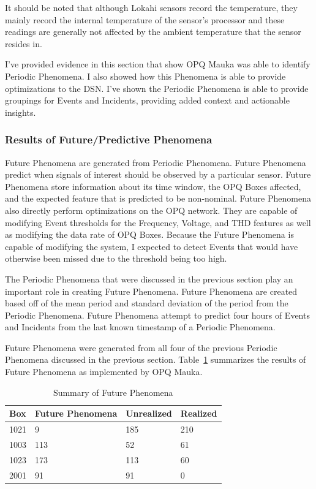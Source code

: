 It should be noted that although Lokahi sensors record the temperature, they mainly record the internal temperature of the sensor's processor and these readings are generally not affected by the ambient temperature that the sensor resides in.

I've provided evidence in this section that show OPQ Mauka was able to identify Periodic Phenomena. I also showed how this Phenomena is able to provide optimizations to the DSN. I've shown the Periodic Phenomena is able to provide groupings for Events and Incidents, providing added context and actionable insights.

\subsubsection{Results of Future/Predictive Phenomena}

Future Phenomena are generated from Periodic Phenomena. Future Phenomena predict when signals of interest should be observed by a particular sensor. Future Phenomena store information about its time window, the OPQ Boxes affected, and the expected feature that is predicted to be non-nominal. Future Phenomena also directly perform optimizations on the OPQ network. They are capable of modifying Event thresholds for the Frequency, Voltage, and THD features as well as modifying the data rate of OPQ Boxes. Because the Future Phenomena is capable of modifying the system, I expected to detect Events that would have otherwise been missed due to the threshold being too high.

The Periodic Phenomena that were discussed in the previous section play an important role in creating Future Phenomena. Future Phenomena are created based off of the mean period and standard deviation of the period from the Periodic Phenomena. Future Phenomena attempt to predict four hours of Events and Incidents from the last known timestamp of a Periodic Phenomena.

Future Phenomena were generated from all four of the previous Periodic Phenomena discussed in the previous section. Table~\ref{table:future_summary} summarizes the results of Future Phenomena as implemented by OPQ Mauka.

\begin{table}[H]
    \centering
    \caption{Summary of Future Phenomena}
    \begin{tabularx}{\textwidth}{llll}
        \toprule
        \textbf{Box} & \textbf{Future Phenomena} &\textbf{Unrealized} & \textbf{Realized} \\
        \midrule
        1021 & 9 & 185 & 210 \\
        1003 & 113 & 52 & 61 \\
        1023 & 173 & 113 & 60 \\
        2001 & 91 & 91 & 0 \\
        \bottomrule
    \end{tabularx}
    \label{table:future_summary}
\end{table}

